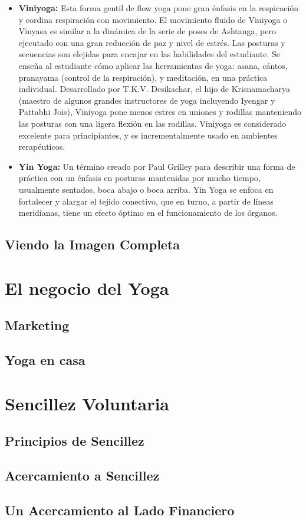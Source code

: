 \begin{itemize}
	\item \textbf{Viniyoga:} Esta forma gentil de flow yoga pone gran \'enfasis en la respicación y cordina respiración con movimiento. El movimiento fluido de Viniyoga o Vinyasa es similar a la dinámica de la serie de poses de Ashtanga, pero ejecutado con una gran reducción de paz y nivel de estr\'es. Las posturas y secuencias son elejidas para encajar en las habilidades del estudiante. Se enseña al estudiante cómo aplicar las herramientas de yoga: asana, cántos, pranayama (control de la respiración), y meditación, en una práctica individual. Desarrollado por T.K.V. Desikachar, el hijo de Krisnamacharya (maestro de algunos grandes instructores de yoga incluyendo Iyengar y Pattabhi Jois), Viniyoga pone menos estres en uniones y rodillas manteniendo las posturas con una ligera flexión en las rodillas. Viniyoga es considerado excelente para principiantes, y es incrementalmente usado en ambientes rerap\'euticos.
	\item \textbf{Yin Yoga:} Un t\'ermino creado por Paul Grilley para describir una forma de práctica con un \'enfasis en posturas mantenidas por mucho tiempo, usualmente sentados, boca abajo o boca arriba. Yin Yoga se enfoca en fortalecer y alargar el tejido conectivo, que en turno, a partir de líneas meridianas, tiene un efecto óptimo en el funcionamiento de los órganos.
\end{itemize}

\subsection{Viendo la Imagen Completa}

\section{El negocio del Yoga}
\subsection{Marketing}
\subsection{Yoga en casa}
\section{Sencillez Voluntaria}
\subsection{Principios de Sencillez}
\subsection{Acercamiento a Sencillez}
\subsection{Un Acercamiento al Lado Financiero}
